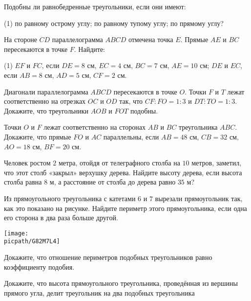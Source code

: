 \begin{class}[number=4]
	\begin{listofex}
		\item Подобны ли равнобедренные треугольники, если они имеют:
		\begin{tasks}(1)
			\task по равному острому углу;
			\task по равному тупому углу;
			\task по прямому углу?			
		\end{tasks}
		\item На стороне \( CD \) параллелограмма \( ABCD \) отмечена точка \( E \). Прямые \( AE \) и \( BC \) пересекаются в точке \( F \). Найдите: 
		\begin{tasks}(1)
			\task \( EF \) и \( FC \), если \( DE=8 \) см, \( EC=4 \) см, \( BC=7 \) см, \( AE=10 \) см;
			\task \( DE \) и \( EC \), если \( AB=8 \) см, \( AD=5 \) см, \( CF=2 \) см.
		\end{tasks}  
		\item Диагонали параллелограмма \( ABCD \) пересекаются в точке \( O \). Точки \( F \) и \( T \) лежат соответственно на отрезках \( OC \) и \( OD \) так, что \( CF:FO=1:3 \) и \( DT:TO=1:3 \). Докажите, что треугольники \( AOB \) и \( FOT \) подобны.
		\item Точки \( O \) и \( F \) лежат соответственно на сторонах \( AB \) и \( BC \) треугольника \( ABC \). Докажите, что прямые \( FO \) и \( AC \) параллельны, если \( AB=48 \) см, \( CB=32 \) см, \( AO=18 \) см, \( BF=20 \) см.
		\item Человек ростом \( 2 \) метра, отойдя от телеграфного столба на \( 10 \) метров, заметил, что этот столб «закрыл» верхушку дерева. Найдите высоту дерева, если высота столба равна \( 8 \) м, а расстояние от столба до дерева равно \( 35 \) м?
		\item Из прямоугольного треугольника с катетами \( 6 \) и \( 7 \) вырезали прямоугольник так, как это показано на рисунке. Найдите периметр этого прямоугольника, если одна его сторона в два раза больше другой.
		\begin{center}
			\texttt{[image: \\picpath/G82M7L4]}
		\end{center}
		\item Докажите, что отношение периметров подобных треугольников равно коэффициенту подобия.
		\item Докажите, что высота прямоугольного треугольника, проведённая из вершины прямого угла, делит треугольник на два подобных треугольника
	\end{listofex}
\end{class}

